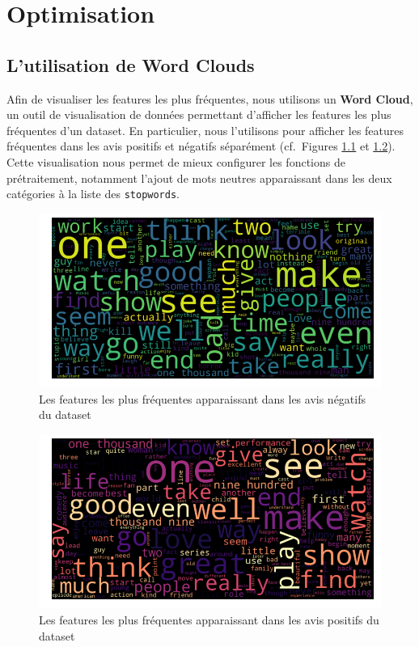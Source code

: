 \documentclass[12pt,a4paper]{report}
\theoremstyle{definition}
\begin{document}
\chapter{Optimisation}
\section{L'utilisation de Word Clouds}
Afin de visualiser les features les plus fréquentes, nous utilisons un \textbf{Word Cloud}, un outil de visualisation de données permettant d'afficher les features les plus fréquentes d'un dataset. En particulier, nous l'utilisons pour afficher les features fréquentes dans les avis positifs et négatifs séparément (cf.~Figures \ref{fig:negative_wordcloud} et \ref{fig:positive_wordcloud}). Cette visualisation nous permet de mieux configurer les fonctions de prétraitement, notamment l'ajout de mots neutres apparaissant dans les deux catégories à la liste des \texttt{stopwords}.

\begin{figure}[!ht]
  \centering
  \includegraphics[scale=0.5]{images/wordcloud/negative_wordcloud.png}
  \caption{Les features les plus fréquentes apparaissant dans les avis négatifs du dataset}
  \label{fig:negative_wordcloud}
\end{figure}

\begin{figure}[!ht]
  \centering
  \includegraphics[scale=0.5]{images/wordcloud/positive_wordcloud.png}
  \caption{Les features les plus fréquentes apparaissant dans les avis positifs du dataset}
  \label{fig:positive_wordcloud}
\end{figure}
\end{document}
